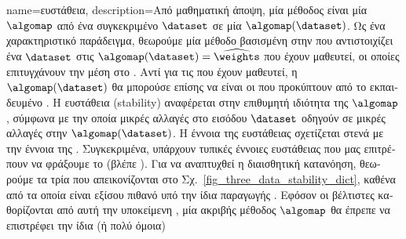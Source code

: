 {name={\foreignlanguage{greek}{ευστάθεια}},
	description={\foreignlanguage{greek}{Από μαθηματική άποψη, μία μέθοδος}  \foreignlanguage{greek}{είναι μία}  
		$\algomap$ \foreignlanguage{greek}{από ένα συγκεκριμένο}  $\dataset$ \foreignlanguage{greek}{σε μία}  
		$\algomap(\dataset)$. \foreignlanguage{greek}{Ως ένα χαρακτηριστικό παράδειγμα, θεωρούμε μία μέθοδο}  
		\foreignlanguage{greek}{βασισμένη στην}  \foreignlanguage{greek}{που αντιστοιχίζει ένα}  $\dataset$ 
		\foreignlanguage{greek}{στις}  $\algomap(\dataset) = \widehat{\weights}$ \foreignlanguage{greek}{που έχουν μαθευτεί, οι 
		οποίες επιτυγχάνουν την}  \foreignlanguage{greek}{μέση}  \foreignlanguage{greek}{στο} 
		. \foreignlanguage{greek}{Αντί για τις}  \foreignlanguage{greek}{που έχουν μαθευτεί, η} 
		 $\algomap(\dataset)$ \foreignlanguage{greek}{θα μπορούσε επίσης να είναι οι}  
		\foreignlanguage{greek}{που προκύπτουν από το εκπαιδευμένο} . \foreignlanguage{greek}{Η ευστάθεια} 
		(stability) \foreignlanguage{greek}{αναφέρεται στην επιθυμητή ιδιότητα της $\algomap$, 
		σύμφωνα με την οποία μικρές αλλαγές στο}  \foreignlanguage{greek}{εισόδου $\dataset$ οδηγούν σε μικρές αλλαγές στην} 
		 $\algomap(\dataset)$. \foreignlanguage{greek}{Η έννοια της ευστάθειας σχετίζεται στενά με την έννοια της}
		. \foreignlanguage{greek}{Συγκεκριμένα, υπάρχουν τυπικές έννοιες ευστάθειας που μας επιτρέπουν να  
		φράξουμε το}  (\foreignlanguage{greek}{βλέπε} \cite[\foreignlanguage{greek}{Κεφ.}~13]{ShalevMLBook}).
		\foreignlanguage{greek}{Για να αναπτυχθεί η διαισθητική κατανόηση, θεωρούμε τα τρία}  \foreignlanguage{greek}{που 
		απεικονίζονται στο Σχ.}\ \ref{fig_three_data_stability_dict}, \foreignlanguage{greek}{καθένα από τα οποία είναι εξίσου πιθανό υπό την ίδια} 
		 \foreignlanguage{greek}{παραγωγής} . \foreignlanguage{greek}{Εφόσον οι βέλτιστες} 
		 \foreignlanguage{greek}{καθορίζονται από αυτή την υποκείμενη} , \foreignlanguage{greek}{μία 
		ακριβής μέθοδος}  $\algomap$ \foreignlanguage{greek}{θα έπρεπε να επιστρέφει την ίδια (ή πολύ όμοια)}  
}}
